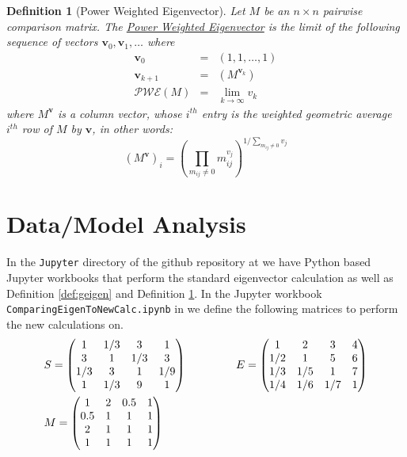 \documentclass[11pt]{article}
\newtheorem{definition}{Definition}
\begin{document}
\begin{definition}[Power Weighted Eigenvector]
	\label{def:pweigen}
	Let $M$ be an $n \times n$ pairwise comparison matrix.  The 
	\ul{Power Weighted Eigenvector} is the limit of the following sequence of
	vectors $\mathbf{v}_0, \mathbf{v}_1, \ldots$ where
	\begin{eqnarray*}
		\mathbf{v}_0 &=& (1, 1, \ldots, 1) \\
		\mathbf{v}_{k+1} &=& (M ^ {\mathbf{v}_k}) \\
		\mathcal{PWE}(M) &=& \lim_{k\to \infty} v_k
	\end{eqnarray*}
	where $M ^{\mathbf{v}}$ is a column vector, whose $i^{th}$ entry
	is the weighted geometric average $i^{th}$ row of $M$ by $\mathbf{v}$, in
	other words:
	$$\left(M^{\mathbf{v}}\right)_i = \left(\prod_{m_{ij}\neq 0} m_{ij}^{v_j}\right) ^{1/\sum_{m_{ij}\neq 0} v_j} $$
	
\end{definition}

\section{Data/Model Analysis}
In the \texttt{Jupyter} directory of the github repository at \cite{githubahppri}
we have Python based Jupyter workbooks that perform the standard eigenvector 
calculation as well as Definition \ref{def:geigen} and Definition \ref{def:pweigen}.
In the Jupyter workbook \texttt{Comparing\-Eigen\-To\-New\-Calc\-.ipynb}
in \cite{githubahppri} we define the following matrices to perform the new calculations
on.
\begin{eqnarray*}
	&S =
	\begin{pmatrix}
		1 &  1/3 & 3 & 1 \\ 
 		3 & 1 & 1/3  & 3 \\ 
        1/3 & 3 & 1 & 1/9 \\ 
        1 & 1/3 & 9 & 1
	\end{pmatrix}&
	\hspace{0.5in} E =
	\begin{pmatrix}
	  1 &     2 &     3 &     4 \\
  	  1/2 &   1   &  5  &   6 \\
   	  1/3 & 1/5  &  1  &   7  \\
  	  1/4 & 1/6 &  1/7 &  1	
	\end{pmatrix}
	\\
	&M =
	\begin{pmatrix}
		1 &   2 &   0.5 &  1 \\
        0.5 & 1 &   1 &    1 \\
      	2 &   1 &   1 &    1 \\
 		1 &   1 &   1 &    1
	\end{pmatrix} &
	\hspace{0.5in}
\end{eqnarray*}
\end{document}
